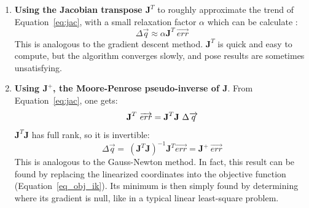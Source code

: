 \begin{enumerate}[itemsep=0em, topsep=0em, leftmargin=*]
    \item \textbf{Using the Jacobian transpose $\textbf{J}^T$} to roughly approximate the trend of Equation~\ref{eq:jac}, with a small relaxation factor $\alpha$ which can be calculate \cite{Buss2009}:
    \begin{equation}
      \Delta \overrightarrow{q} \approx \alpha \textbf{J}^T \ \overrightarrow{err}
    \end{equation} 
    This is analogous to the gradient descent method. $\textbf{J}^T$ is quick and easy to compute, but the algorithm converges slowly, and pose results are sometimes unsatisfying.
    
    \item \textbf{Using $\textbf{J}^+$, the Moore-Penrose pseudo-inverse of J}. From Equation~\ref{eq:jac}, one gets:
    \begin{equation}
        \textbf{J}^T \ \overrightarrow{err} = \textbf{J}^T \textbf{J} \ \Delta \overrightarrow{q}\\
    \end{equation}
    $\textbf{J}^T \textbf{J}$ has full rank, so it is invertible:
    \begin{equation}\label{eq:pseudoinv}
        \Delta \overrightarrow{q} = \ (\textbf{J}^T \textbf{J})^{-1} \textbf{J}^T \overrightarrow{err} = \textbf{J}^+ \ \overrightarrow{err} 
    \end{equation} 
    This is analogous to the Gauss-Newton method. In fact, this result can be found by replacing the linearized coordinates into the objective function (Equation~\ref{eq_obj_ik}). Its minimum is then simply found by determining where its gradient is null, like in a typical linear least-square problem. 
    

\end{enumerate}
